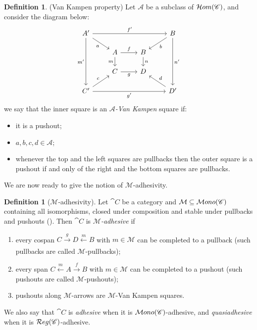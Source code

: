 \documentclass[a4paper, twoside,openright]{report}
\theoremstyle{plain}
\theoremstyle{definition}
\newtheorem{definition}[theorem]{Definition}
\begin{document}
\begin{definition}(Van Kampen property)
    Let $\mathcal A$ be a subclass of $\mathcal{H}om(\mathscr{C})$, and consider the diagram below:
    \[
    \begin{tikzcd}[row sep = scriptsize]
        A' \arrow[ddd, "m'"swap] \arrow[rrr, "f'"] \arrow[dr, "a"swap] & & & B \arrow[ddd, "n'"] \arrow[dl, "b"] \\
        & A \arrow[r, "f"] \arrow[d, "m" swap] & B \arrow[d, "n"]   & \\
        & C \arrow[r, "g" swap]                & D                  & \\
        C' \arrow[rrr, "g'"swap] \arrow[ur, "c"] & & & D' \arrow[ul, "d" swap] 
    \end{tikzcd}
    \]
    we say that the inner square is an \emph{$\mathcal A$-Van Kampen} square if:
    \begin{itemize}
        \item it is a pushout;
        \item $a, b, c, d \in \mathcal{A}$;
        \item whenever the top and the left squares are pullbacks then the outer square is a pushout if and only of the right and the bottom squares are pullbacks.
    \end{itemize}
\end{definition}

We are now ready to give the notion of $\mathcal M$-adhesivity. %

\begin{definition}[$\mathcal{M}$-adhesivity]\label{def:adh}
    Let $\cat C$ be a category and $\mathcal M \subseteq \mathcal{M}ono(\mathscr{C})$ containing all isomorphisms, closed under composition and stable under pullbacks and pushouts ().
    Then $\cat C$ is \emph{$\mathcal M$-adhesive} if
    \begin{enumerate}
        \item every cospan $C \xrightarrow[]{g} D \xleftarrow[]{m} B$ with $m \in \mathcal M$ can be completed to a pullback (such pullbacks are called $\mathcal M$-pullbacks);
        \item every span $C \xleftarrow{m} A \xrightarrow{f} B$ with $ m \in \mathcal M$ can be completed to a pushout (such pushouts are called $\mathcal M$-pushouts);
        \item pushouts along $\mathcal M$-arrows are $\mathcal M$-Van Kampen squares.
    \end{enumerate}
    We also say that $\cat C$ is \emph{adhesive} when it is $\mathcal{M}ono(\mathscr{C})$-adhesive, and \emph{quasiadhesive} when it is $\mathcal{R}eg(\mathscr{C})$-adhesive.
\end{definition}
\end{document}

